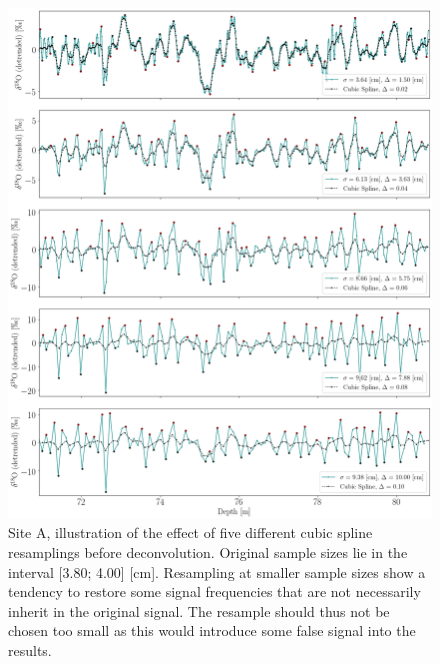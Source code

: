 \documentclass[../../CompleteThesis2/Complete_2ndDraft]{subfiles}
\begin{document}
\begin{figure}[h]
	\centering
	\includegraphics[width=\textwidth]{SiteA_InterpBF_SpecificResamplings.png}
	\caption[Back diffused data, Site A, different resamplings before deconvolution.]{\small Site A, illustration of the effect of five different cubic spline resamplings before deconvolution. Original sample sizes lie in the interval [3.80; 4.00] [cm]. Resampling at smaller sample sizes show a tendency to restore some signal frequencies that are not necessarily inherit in the original signal. The resample should thus not be chosen too small as this would introduce some false signal into the results.}
	\label{Fig:COMPMETH_SiteA_interpBF_SpecificSamplings}
\end{figure}
\end{document}

